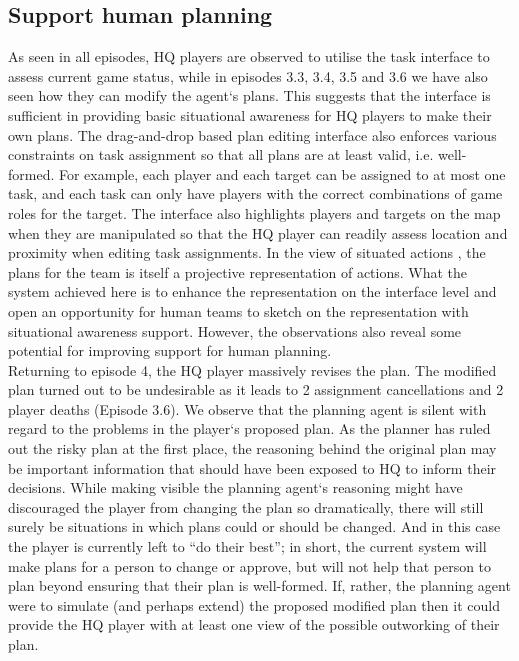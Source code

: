 \subsection{Support human planning} \label{sec:study3supportPlanning}
As seen in all episodes, HQ players are observed to utilise the task interface to assess current game status, while in episodes 3.3, 3.4, 3.5 and 3.6 we have also seen how they can modify the agent`s plans. This suggests that the interface is sufficient in providing basic situational awareness for HQ players to make their own plans. The drag-and-drop based plan editing interface also enforces various constraints on task assignment so that all plans are at least valid, i.e. well-formed. For example, each player and each target can be assigned to at most one task, and each task can only have players with the correct combinations of game roles for the target. The interface also highlights players and targets on the map when they are manipulated so that the HQ player can readily assess location and proximity when editing task assignments. In the view of situated actions \cite{Suchman1987}, the plans for the team is itself a projective representation of actions. What the system achieved here is to enhance the representation on the interface level and open an opportunity for human teams to sketch on the representation with situational awareness support. However, the observations also reveal some potential for improving support for human planning.\\

Returning to episode 4, the HQ player massively revises the plan. The modified plan turned out to be undesirable as it leads to 2 assignment cancellations and 2 player deaths (Episode 3.6).  We observe that the planning agent is silent with regard to the problems in the player`s proposed plan. As the planner has ruled out the risky plan at the first place, the reasoning behind the original plan may be important information that should have been exposed to HQ to inform their decisions. While making visible the planning agent`s reasoning might have discouraged the player from changing the plan so dramatically, there will still surely be situations in which plans could or should be changed. And in this case the player is currently left to ``do their best''; in short, the current system will make plans for a person to change or approve, but will not help that person to plan beyond ensuring that their plan is well-formed. If, rather, the planning agent were to simulate (and perhaps extend) the proposed modified plan then it could provide the HQ player with at least one view of the possible outworking of their plan.\\

